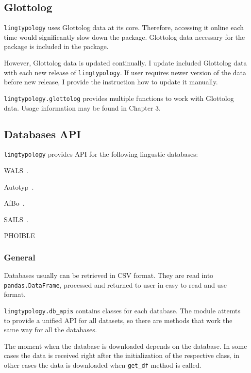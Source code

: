 \documentclass[a4paper,12pt]{article}
\begin{document}
\subsection{Glottolog}

\texttt{lingtypology} uses Glottolog data at its core. Therefore, accessing it online each time would significantly slow down the package. Glottolog data necessary for the package is included in the package.

However, Glottolog data is updated continually. I update included Glottolog data with each new release of \texttt{lingtypology}. If user requires newer version of the data before new release, I provide the instruction how to update it manually.

\texttt{lingtypology.glottolog} provides multiple functions to work with Glottolog data. Usage information may be found in Chapter 3.

\subsection{Databases API}

\texttt{lingtypology} provides API for the following lingustic databases:
\begin{itemize}
\begin{samepage}
 \item WALS~\parencite{wals}.
 \item Autotyp~\parencite{autotyp}.
 \item AfBo~\parencite{afbo}.
 \item SAILS~\parencite{sails}.
 \item PHOIBLE~\parencite{phoible}
\end{samepage}
\end{itemize}

\subsubsection{General}
Databases usually can be retrieved in CSV format. They are read into \texttt{pandas.DataFrame}, processed and returned to user in easy to read and use format.

\texttt{lingtypology.db\_apis} contains classes for each database. The module attemts to provide a unified API for all datasets, so there are methods that work the same way for all the databases.

The moment when the database is downloaded depends on the database. In some cases the data is received right after the initialization of the respective class, in other cases the data is downloaded when \texttt{get\_df} method is called.
\end{document}
